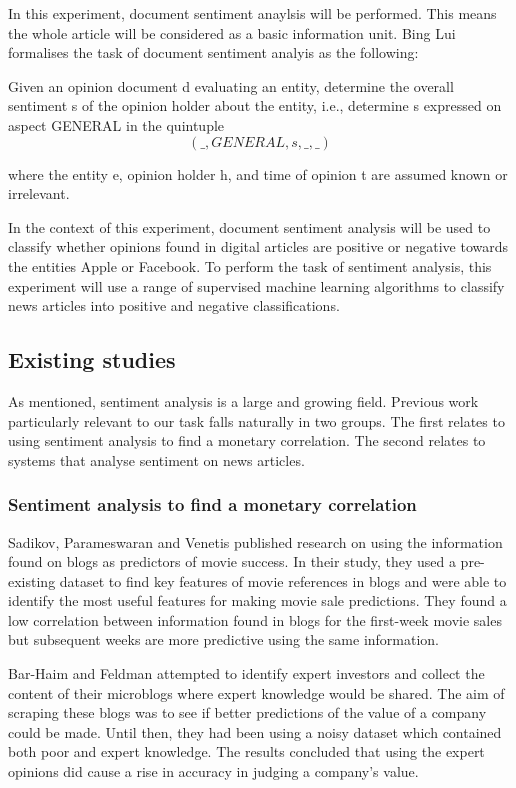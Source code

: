 \documentclass[a4paper,11pt]{report}
\begin{document}
In this experiment, document sentiment anaylsis will be performed. This means the whole article will be considered as a basic information unit. Bing Lui formalises the task of document sentiment analyis as the following:

\begin{displayquote}
	Given an opinion document d evaluating an entity, determine the overall sentiment s of the opinion holder about the entity, i.e., determine s expressed on aspect GENERAL in the quintuple
	\\\[(\_, GENERAL, s,\_, \_)\]

	where the entity e, opinion holder h, and time of opinion t are assumed known or irrelevant.
\end{displayquote}

In the context of this experiment, document sentiment analysis will be used to classify whether opinions found in digital articles are positive or negative towards the entities Apple or Facebook. To perform the task of sentiment analysis, this experiment will use a range of supervised machine learning algorithms to classify news articles into positive and negative classifications.

\subsection{Existing studies}
As mentioned, sentiment analysis is a large and growing field. Previous work particularly relevant to our task falls naturally in two groups. The first relates to using sentiment analysis to find a monetary correlation. The second relates to systems that analyse sentiment on news articles.

\subsubsection{Sentiment analysis to find a monetary correlation}

Sadikov, Parameswaran and Venetis published research on using the information found on blogs as predictors of movie success. In their study, they used a pre-existing dataset to find key features of movie references in blogs and were able to identify the most useful features for making movie sale predictions. They found a low correlation between information found in blogs for the first-week movie sales but subsequent weeks are more predictive using the same information.

Bar-Haim and Feldman attempted to identify expert investors and collect the content of their microblogs where expert knowledge would be shared. The aim of scraping these blogs was to see if better predictions of the value of a company could be made. Until then, they had been using a noisy dataset which contained both poor and expert knowledge. The results concluded that using the expert opinions did cause a rise in accuracy in judging a company's value.
\end{document}
